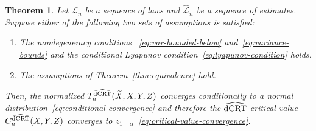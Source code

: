 \documentclass[12pt]{article}
\newtheorem{theorem}{Theorem}
\theoremstyle{definition}
\theoremstyle{remark}
\newcommand{\srx}{X}									%
\newcommand{\srz}{Z}									%
\newcommand{\srxk}{\widetilde X}						%
\newcommand{\sry}{Y}									%
\newcommand{\law}{\mathcal L}							%
\newcommand{\lawhat}{\widehat{\mathcal L}}				%
\newcommand{\dCRThat}{\widehat{\textnormal{dCRT}}}		%
\begin{document}
\begin{theorem} \label{thm:normal-limit-stronger}
	Let $\law_n$ be a sequence of laws and $\lawhat_n$ be a sequence of estimates. Suppose either of the following two sets of assumptions is satisfied: 
	\begin{enumerate}
		\item The nondegeneracy conditions ~\eqref{eq:var-bounded-below} and~\eqref{eq:variance-bounds} and the conditional Lyapunov condition~\eqref{eq:lyapunov-condition} holds.
		\item The assumptions of Theorem~\ref{thm:equivalence} hold.
	\end{enumerate}
	Then, the normalized $T_n^{\dCRThat}(\srxk, \srx, \sry, \srz)$ converges conditionally to a normal distribution~\eqref{eq:conditional-convergence} and therefore the $\dCRThat$ critical value $C^{\dCRThat}_n(\srx, \sry, \srz)$ converges to $z_{1-\alpha}$~\eqref{eq:critical-value-convergence}.
\end{theorem}
\end{document}
